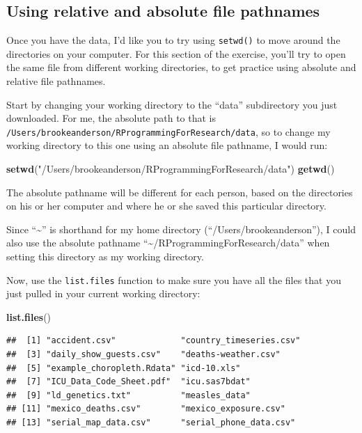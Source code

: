 \documentclass[]{book}
\makeatletter
\newenvironment{Shaded}{\begin{snugshade}}{\end{snugshade}}
\newcommand{\KeywordTok}[1]{\textcolor[rgb]{0.13,0.29,0.53}{\textbf{{#1}}}}
\newcommand{\StringTok}[1]{\textcolor[rgb]{0.31,0.60,0.02}{{#1}}}
\newcommand{\NormalTok}[1]{{#1}}
\newenvironment{kframe}{%
\medskip{}
\setlength{\fboxsep}{.8em}
 \def\at@end@of@kframe{}%
 \ifinner\ifhmode%
  \def\at@end@of@kframe{\end{minipage}}%
  \begin{minipage}{\columnwidth}%
 \fi\fi%
 \def\FrameCommand##1{\hskip\@totalleftmargin \hskip-\fboxsep
 \colorbox{shadecolor}{##1}\hskip-\fboxsep
     \hskip-\linewidth \hskip-\@totalleftmargin \hskip\columnwidth}%
 \MakeFramed {\advance\hsize-\width
   \@totalleftmargin\z@ \linewidth\hsize
   \@setminipage}}%
 {\par\unskip\endMakeFramed%
 \at@end@of@kframe}
\renewenvironment{Shaded}{\begin{kframe}}{\end{kframe}}
\newenvironment{rmdblock}[1]
  {
  \begin{itemize}
  \renewcommand{\labelitemi}{
    \raisebox{-.7\height}[0pt][0pt]{
      {\setkeys{Gin}{width=3em,keepaspectratio}\texttt{[image: images/\#1]}}
    }
  }
  \setlength{\fboxsep}{1em}
  \begin{kframe}
  \item
  }
  {
  \end{kframe}
  \end{itemize}
  }
\newenvironment{rmdnote}
  {\begin{rmdblock}{note}}
  {\end{rmdblock}}
\makeatother
\begin{document}
\subsection{Using relative and absolute file
pathnames}\label{using-relative-and-absolute-file-pathnames}

Once you have the data, I'd like you to try using \texttt{setwd()} to
move around the directories on your computer. For this section of the
exercise, you'll try to open the same file from different working
directories, to get practice using absolute and relative file pathnames.

Start by changing your working directory to the ``data'' subdirectory
you just downloaded. For me, the absolute path to that is
\texttt{/Users/brookeanderson/RProgrammingForResearch/data}, so to
change my working directory to this one using an absolute file pathname,
I would run:

\begin{Shaded}
\begin{Highlighting}[]
\KeywordTok{setwd}\NormalTok{(}\StringTok{"/Users/brookeanderson/RProgrammingForResearch/data"}\NormalTok{)}
\KeywordTok{getwd}\NormalTok{()}
\end{Highlighting}
\end{Shaded}

The absolute pathname will be different for each person, based on the
directories on his or her computer and where he or she saved this
particular directory.

\begin{rmdnote}
Since ``\textasciitilde{}'' is shorthand for my home directory
(``/Users/brookeanderson''), I could also use the absolute pathname
``\textasciitilde{}/RProgrammingForResearch/data'' when setting this
directory as my working directory.
\end{rmdnote}

Now, use the \texttt{list.files} function to make sure you have all the
files that you just pulled in your current working directory:

\begin{Shaded}
\begin{Highlighting}[]
\KeywordTok{list.files}\NormalTok{()}
\end{Highlighting}
\end{Shaded}

\begin{verbatim}
##  [1] "accident.csv"             "country_timeseries.csv"  
##  [3] "daily_show_guests.csv"    "deaths-weather.csv"      
##  [5] "example_choropleth.Rdata" "icd-10.xls"              
##  [7] "ICU_Data_Code_Sheet.pdf"  "icu.sas7bdat"            
##  [9] "ld_genetics.txt"          "measles_data"            
## [11] "mexico_deaths.csv"        "mexico_exposure.csv"     
## [13] "serial_map_data.csv"      "serial_phone_data.csv"
\end{verbatim}
\end{document}

